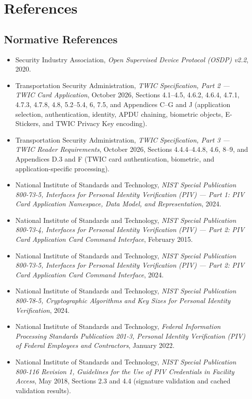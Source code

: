 \section{References}

\subsection{Normative References}

\begin{itemize}
  \item Security Industry Association, \emph{Open Supervised Device Protocol (OSDP) v2.2}, 2020.
  \item Transportation Security Administration, \emph{TWIC Specification, Part 2 --- TWIC Card Application}, October 2026, Sections 4.1--4.5, 4.6.2, 4.6.4, 4.7.1, 4.7.3, 4.7.8, 4.8, 5.2--5.4, 6, 7.5, and Appendices C--G and J (application selection, authentication, identity, APDU chaining, biometric objects, E-Stickers, and TWIC Privacy Key encoding).
  \item Transportation Security Administration, \emph{TWIC Specification, Part 3 --- TWIC Reader Requirements}, October 2026, Sections 4.4.4--4.4.8, 4.6, 8--9, and Appendices D.3 and F (TWIC card authentication, biometric, and application-specific processing).
  \item National Institute of Standards and Technology, \emph{NIST Special Publication 800-73-5, Interfaces for Personal Identity Verification (PIV) --- Part 1: PIV Card Application Namespace, Data Model, and Representation}, 2024.
  \item National Institute of Standards and Technology, \emph{NIST Special Publication 800-73-4, Interfaces for Personal Identity Verification (PIV) — Part 2: PIV Card Application Card Command Interface}, February 2015.
  \item National Institute of Standards and Technology, \emph{NIST Special Publication 800-73-5, Interfaces for Personal Identity Verification (PIV) — Part 2: PIV Card Application Card Command Interface}, 2024.
  \item National Institute of Standards and Technology, \emph{NIST Special Publication 800-78-5, Cryptographic Algorithms and Key Sizes for Personal Identity Verification}, 2024.
  \item National Institute of Standards and Technology, \emph{Federal Information Processing Standards Publication 201-3, Personal Identity Verification (PIV) of Federal Employees and Contractors}, January 2022.
  \item National Institute of Standards and Technology, \emph{NIST Special Publication 800-116 Revision 1, Guidelines for the Use of PIV Credentials in Facility Access}, May 2018, Sections 2.3 and 4.4 (signature validation and cached validation results).

\end{itemize}
